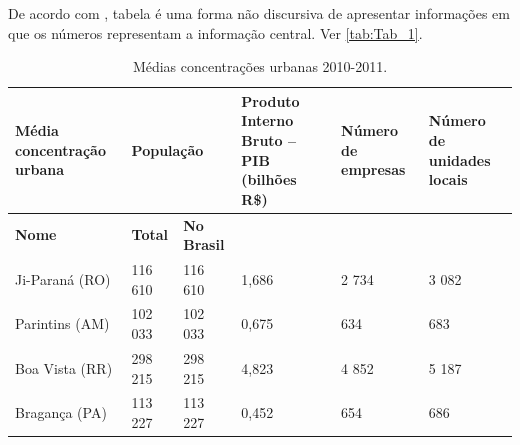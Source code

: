 
De acordo com \textcite{ibge1993}, tabela é uma forma não discursiva de apresentar informações em que os números representam a informação central. Ver \autoref{tab:Tab_1}.

\begin{table}[htb]
	\ABNTEXfontereduzida
	\caption{\label{tab:Tab_1}Médias concentrações urbanas 2010-2011.}
	\begin{tabular}{@{}p{3.0cm}p{1.5cm}p{2cm}p{2.5cm}p{2.5cm}p{2.5cm}@{}}
		\toprule
		\textbf{Média concentração urbana} & \multicolumn{2}{l}{\textbf{População}} & \textbf{Produto Interno Bruto – PIB (bilhões R\$)} & \textbf{Número de empresas} & \textbf{Número de unidades locais} \\ \midrule
		\textbf{Nome}                      & \textbf{Total}   & \textbf{No Brasil}  &                                                   &                             & \\
		Ji-Paraná (RO)                     & 116 610          & 116 610             & 1,686                                             & 2 734                       & 3 082 \\
		Parintins (AM)                     & 102 033          & 102 033             & 0,675                                             & 634                         & 683 \\
		Boa Vista (RR)                     & 298 215          & 298 215             & 4,823                                             & 4 852                       & 5 187 \\
		Bragança (PA)                      & 113 227          & 113 227             & 0,452                                             & 654                         & 686 \\ \bottomrule
	\end{tabular}
\end{table}